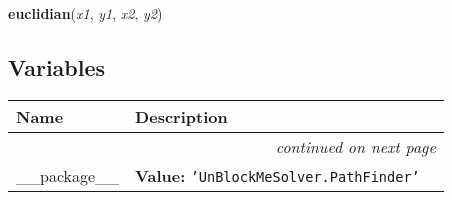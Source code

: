     \vspace{0.5ex}

\hspace{.8\funcindent}\begin{boxedminipage}{\funcwidth}

    \raggedright \textbf{euclidian}(\textit{x1}, \textit{y1}, \textit{x2}, \textit{y2})

\setlength{\parskip}{2ex}
\setlength{\parskip}{1ex}
    \end{boxedminipage}



  \subsection{Variables}

    \vspace{-1cm}
\hspace{\varindent}\begin{longtable}{|p{\varnamewidth}|p{\vardescrwidth}|l}
\cline{1-2}
\cline{1-2} \centering \textbf{Name} & \centering \textbf{Description}& \\
\cline{1-2}
\endhead\cline{1-2}\multicolumn{3}{r}{\small\textit{continued on next page}}\\\endfoot\cline{1-2}
\endlastfoot\raggedright \_\-\_\-p\-a\-c\-k\-a\-g\-e\-\_\-\_\- & \raggedright \textbf{Value:} 
{\tt \texttt{'}\texttt{UnBlockMeSolver.PathFinder}\texttt{'}}&\\
\cline{1-2}
\end{longtable}

